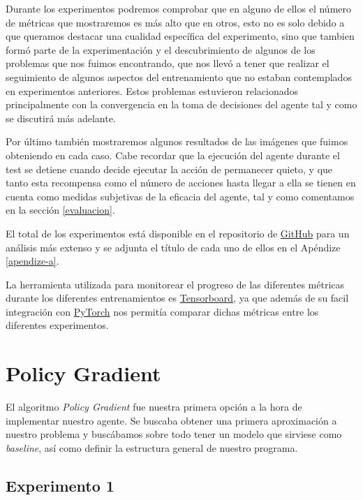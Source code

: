 Durante los experimentos podremos comprobar que en alguno de ellos el número de métricas que mostraremos es más alto que en otros, esto no es solo debido a que queramos destacar una cualidad específica del experimento, sino que tambien formó parte de la experimentación y el descubrimiento de algunos de los problemas que nos fuimos encontrando, que nos llevó a tener que realizar el seguimiento de algunos aspectos del entrenamiento que no estaban contemplados en experimentos anteriores. Estos problemas estuvieron relacionados principalmente con la convergencia en la toma de decisiones del agente tal y como se discutirá más adelante.
\medskip

Por último también mostraremos algunos resultados de las imágenes que fuimos obteniendo en cada caso. Cabe recordar que la ejecución del agente durante el test se detiene cuando decide ejecutar la acción de permanecer quieto, y que tanto esta recompensa como el número de acciones hasta llegar a ella se tienen en cuenta como medidas subjetivas de la eficacia del agente, tal y como comentamos en la sección \ref{evaluacion}.
\medskip

El total de los experimentos está disponible en el repositorio de \href{https://github.com/lucaswerner90/msc-degree-ai}{GitHub} para un análisis más extenso y se adjunta el título de cada uno de ellos en el Apéndize \ref{apendize-a}. 
\medskip

La herramienta utilizada para monitorear el progreso de las diferentes métricas durante los diferentes entrenamientos es \href{https://www.tensorflow.org/tensorboard?hl=es-419}{Tensorboard}, ya que además de su facil integración con \href{https://pytorch.org/}{PyTorch} nos permitía comparar dichas métricas entre los diferentes experimentos.
\medskip

\section{Policy Gradient}
\label{resultados-policy-gradient}

El algoritmo \textit{Policy Gradient} fue nuestra primera opción a la hora de implementar nuestro agente. Se buscaba obtener una primera aproximación a nuestro problema y buscábamos sobre todo tener un modelo que sirviese como \textit{baseline}, así como definir la estructura general de nuestro programa.
\medskip

\subsection{Experimento 1}
\label{resultados-policy-gradient-experimento-1}

